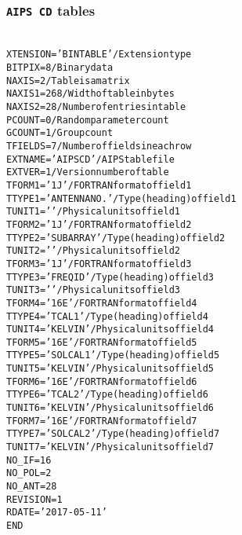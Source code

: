 \documentclass[twoside]{article}
\newcommand{\Hi}[1]{\textcolor{hicol}{#1}}
\begin{document}
\subsubsection{{\tt AIPS CD} tables}
\label{Appe:CDtable}
\begin{alltt}\Hi{
XTENSION= 'BINTABLE'           / Extension type
BITPIX  =                    8 / Binary data
NAXIS   =                    2 / Table is a matrix
NAXIS1  =                  268 / Width of table in bytes
NAXIS2  =                   28 / Number of entries in table
PCOUNT  =                    0 / Random parameter count
GCOUNT  =                    1 / Group count
TFIELDS =                    7 / Number of fields in each row
EXTNAME = 'AIPS CD '           / AIPS table file
EXTVER  =                    1 / Version number of table
TFORM1  = '1J      '           / FORTRAN format of field  1
TTYPE1  = 'ANTENNA NO.     '   / Type (heading) of field  1
TUNIT1  = '        '           / Physical units of field  1
TFORM2  = '1J      '           / FORTRAN format of field  2
TTYPE2  = 'SUBARRAY        '   / Type (heading) of field  2
TUNIT2  = '        '           / Physical units of field  2
TFORM3  = '1J      '           / FORTRAN format of field  3
TTYPE3  = 'FREQ ID         '   / Type (heading) of field  3
TUNIT3  = '        '           / Physical units of field  3
TFORM4  = '16E     '           / FORTRAN format of field  4
TTYPE4  = 'TCAL1           '   / Type (heading) of field  4
TUNIT4  = 'KELVIN  '           / Physical units of field  4
TFORM5  = '16E     '           / FORTRAN format of field  5
TTYPE5  = 'SOLCAL1         '   / Type (heading) of field  5
TUNIT5  = 'KELVIN  '           / Physical units of field  5
TFORM6  = '16E     '           / FORTRAN format of field  6
TTYPE6  = 'TCAL2           '   / Type (heading) of field  6
TUNIT6  = 'KELVIN  '           / Physical units of field  6
TFORM7  = '16E     '           / FORTRAN format of field  7
TTYPE7  = 'SOLCAL2         '   / Type (heading) of field  7
TUNIT7  = 'KELVIN  '           / Physical units of field  7
NO_IF   =           16
NO_POL  =            2
NO_ANT  =           28
REVISION=            1
RDATE   = '2017-05-11'
END}
\end{alltt}
\end{document}
